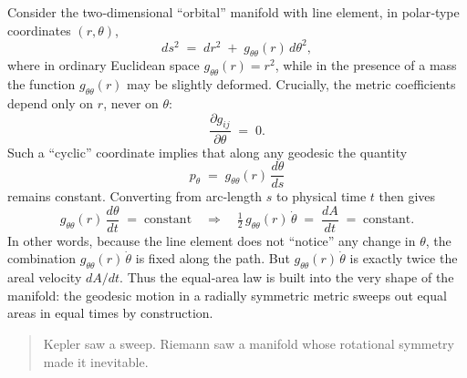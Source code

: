 Consider the two‐dimensional “orbital” manifold with line element, in polar‐type coordinates \((r,\theta)\),
\[
ds^2 \;=\; dr^2 \;+\; g_{\theta\theta}(r)\,d\theta^2,
\]
where in ordinary Euclidean space \(g_{\theta\theta}(r)=r^2\), while in the presence of a mass the function \(g_{\theta\theta}(r)\) may be slightly deformed.  Crucially, the metric coefficients depend only on \(r\), never on \(\theta\):
\[
\frac{\partial g_{ij}}{\partial \theta} \;=\; 0.
\]
Such a “cyclic” coordinate implies that along any geodesic the quantity
\[
p_\theta
\;=\;
g_{\theta\theta}(r)\,\frac{d\theta}{ds}
\]
remains constant.  Converting from arc‐length \(s\) to physical time \(t\) then gives
\[
g_{\theta\theta}(r)\,\frac{d\theta}{dt}
\;=\;
\text{constant}
\quad\Longrightarrow\quad
\tfrac12\,g_{\theta\theta}(r)\,\dot\theta
\;=\;
\frac{dA}{dt}
\;=\;
\text{constant}.
\]
In other words, because the line element does not “notice” any change in \(\theta\), the combination \(g_{\theta\theta}(r)\,\dot\theta\) is fixed along the path.  But \(g_{\theta\theta}(r)\,\dot\theta\) is exactly twice the areal velocity \(dA/dt\).  Thus the equal‐area law is built into the very shape of the manifold: the geodesic motion in a radially symmetric metric sweeps out equal areas in equal times by construction.

\begin{quote}
Kepler saw a sweep.  
Riemann saw a manifold whose rotational symmetry made it inevitable.
\end{quote}



